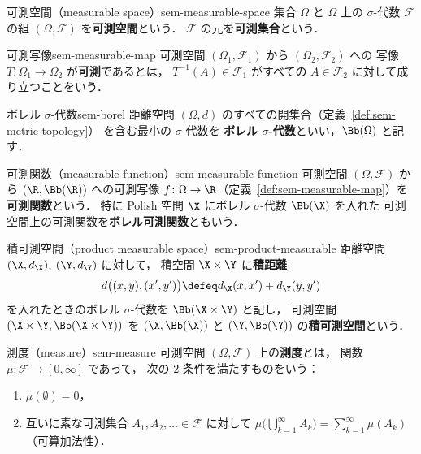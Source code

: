 \begin{definition}{可測空間（measurable space）}{sem-measurable-space}
  集合 $\Omega$ と $\Omega$ 上の $\sigma$-代数 $\mathcal{F}$ の組
  $(\Omega, \mathcal{F})$ を\textbf{可測空間}という．
  $\mathcal{F}$ の元を\textbf{可測集合}という．
\end{definition}

\begin{definition}{可測写像}{sem-measurable-map}
  可測空間 $(\Omega_1, \mathcal{F}_1)$ から $(\Omega_2, \mathcal{F}_2)$ への
  写像 $T \colon \Omega_1 \to \Omega_2$ が\textbf{可測}であるとは，
  $T^{-1}(A) \in \mathcal{F}_1$ がすべての $A \in \mathcal{F}_2$ に対して成り立つことをいう．
\end{definition}

\begin{definition}{ボレル $\sigma$-代数}{sem-borel}
  距離空間 $(\Omega, d)$ のすべての開集合（定義~\ref{def:sem-metric-topology}）
  を含む最小の $\sigma$-代数を
  \textbf{ボレル $\sigma$-代数}といい，$\Bb(\Omega)$ と記す．
\end{definition}

\begin{definition}{可測関数（measurable function）}{sem-measurable-function}
  可測空間 $(\Omega, \mathcal{F})$ から $(\R, \Bb(\R))$ への可測写像
  $f \colon \Omega \to \R$（定義~\ref{def:sem-measurable-map}）を
  \textbf{可測関数}という．
  特に Polish 空間 $\X$ にボレル $\sigma$-代数 $\Bb(\X)$ を入れた
  可測空間上の可測関数を\textbf{ボレル可測関数}ともいう．
\end{definition}

\begin{definition}{積可測空間（product measurable space）}{sem-product-measurable}
  距離空間 $(\X, d_\X)$, $(\Y, d_\Y)$ に対して，
  積空間 $\X \times \Y$ に\textbf{積距離}
  \[
    d\bigl((x, y), (x', y')\bigr) \defeq d_\X(x, x') + d_\Y(y, y')
  \]
  を入れたときのボレル $\sigma$-代数を $\Bb(\X \times \Y)$ と記し，
  可測空間 $(\X \times \Y, \Bb(\X \times \Y))$ を
  $(\X, \Bb(\X))$ と $(\Y, \Bb(\Y))$ の\textbf{積可測空間}という．
\end{definition}

\begin{definition}{測度（measure）}{sem-measure}
  可測空間 $(\Omega, \mathcal{F})$ 上の\textbf{測度}とは，
  関数 $\mu \colon \mathcal{F} \to [0, \infty]$ であって，
  次の 2 条件を満たすものをいう：
  \begin{enumerate}
    \item[(i)] $\mu(\emptyset) = 0$，
    \item[(ii)] 互いに素な可測集合 $A_1, A_2, \ldots \in \mathcal{F}$ に対して
      $\mu\bigl(\bigcup_{k=1}^{\infty} A_k\bigr) = \sum_{k=1}^{\infty} \mu(A_k)$
      （可算加法性）．
  \end{enumerate}
\end{definition}

